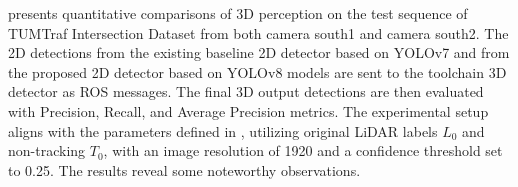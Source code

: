\begin{table}[htbp]
\label{tab:3d_quantitative_yolo}
\end{table}

 presents quantitative comparisons of 3D perception on the test sequence of TUMTraf Intersection Dataset from both camera south1 and camera south2. The 2D detections from the existing baseline 2D detector based on YOLOv7 and from the proposed 2D detector based on YOLOv8 models are sent to the toolchain 3D detector as ROS messages. The final 3D output detections are then evaluated with Precision, Recall, and Average Precision metrics. The experimental setup aligns with the parameters defined in \cite{thesisJoseph}, utilizing original LiDAR labels $L_0$ and non-tracking $T_0$, with an image resolution of 1920 and a confidence threshold set to 0.25. The results reveal some noteworthy observations. 


